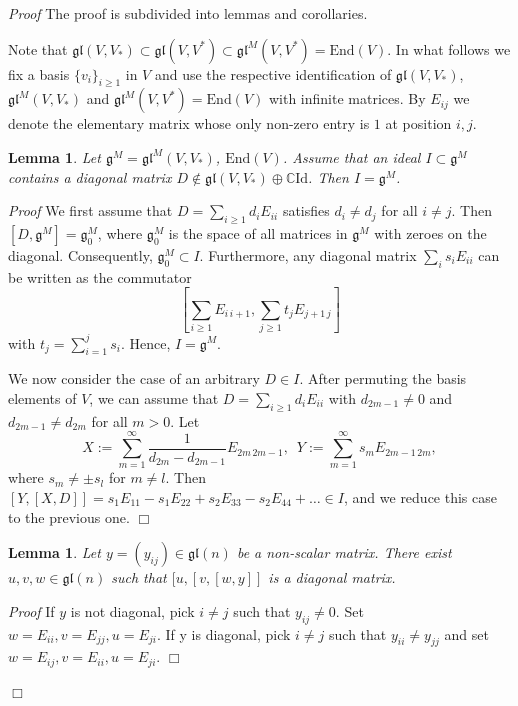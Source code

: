 \documentclass[10pt]{amsart}
\newcounter{theorem}
\newtheorem{lemma}[theo]{Lemma}
\renewenvironment{proof}{ \emph{Proof}}{$\Box$}
\newcommand {\CC} {\mathbb {C}}
\newcommand{\id}{\mathrm{Id}}
\renewcommand{\gg}{\mathfrak{g}}
\newcommand{\gl}{\mathfrak{gl}}
\newcommand{\End}{\mathrm{End}}
\begin{document}
\begin{proof} The proof is subdivided into lemmas and corollaries. 

Note that $\gl(V,V_*)\subset\gl(V,V^*)\subset \gl^M(V,V^*)=\End(V)$.
In what follows we fix a basis $\{v_i\}_{i\geq 1}$ in $V$ and use the respective identification of $\gl(V,V_*)$, $\gl^M(V,V_*)$ and  
$\gl^M(V,V^*)=\End(V)$
with infinite matrices.
By $E_{ij}$ we denote the elementary matrix whose only non-zero entry is $1$ at position $i,j$.

\begin{lemma}\label{lem_diag} Let $\gg^M =\gl^M(V,V_*)$,  $\End(V)$. Assume that an ideal $I \subset \gg^M$ contains a diagonal matrix $D \notin \gl(V,V_*) \oplus \CC \id$. Then $I = \gg^M$.
\end{lemma}

\begin{proof}
We first assume that $D=\sum_{i\geq 1} d_i E_{ii}$ satisfies $d_i \neq d_j$ for all $i \neq j$.
Then $[D,\gg^M] = \gg^M_0$, where $\gg^M_0$ is the space of all matrices in $\gg^M$ with zeroes on the diagonal. Consequently, $\gg^M_0 \subset I$. 
Furthermore, any diagonal matrix $\sum_{i} s_i E_{ii}$ can be written as the commutator
\begin{equation}
 \left[\sum_{i \geq 1} E_{i\,i+1}, \sum_{j \geq1} t_j E_{j+1\,j}\right] \nonumber
\end{equation}
with $t_j = \sum_{i=1}^{j} s_i$.
Hence, $I=\gg^M$.

We now consider the case of an arbitrary $D \in I$. After permuting the basis elements of $V$, we can assume that 
$D = \sum_{i\geq 1} d_i E_{ii}$ with $d_{2m-1} \neq 0$ and  $d_{2m-1} \neq d_{2m}$ for all $m > 0$. Let 
\begin{equation}\label{eq:lem_diag}
 X := \sum_{m=1}^{\infty} \frac{1}{d_{2m}-d_{2m-1}}E_{2m\,2m-1}, \,\,\, Y:=\sum_{m=1}^{\infty} s_m E_{2m-1\,2m}, \nonumber
\end{equation}
where $s_m\neq \pm s_l$ for $m \neq l$. Then $[Y,[X,D]]=s_1E_{11} - s_1E_{22} + s_2E_{33} -s_2E_{44} +\dots \in I$, and we reduce this case to the previous one.
\end{proof}

\begin{lemma}\label{lem_diag2} 
Let $y = (y_{ij})\in \gl(n)$ be a non-scalar matrix. There exist $u,v,w \in \gl(n)$ such that $[u,[v,[w,y]]$ is a diagonal matrix.
\end{lemma}
\begin{proof}
 If $y$ is not diagonal, pick $i \neq j$ such that $y_{ij} \neq 0$. Set $w=E_{ii}, v=E_{jj}, u=E_{ji}$. If y is diagonal, pick $i \neq j$ such that $y_{ii} \neq y_{jj}$ and set $w=E_{ij}, v=E_{ii}, u=E_{ji}$.
\end{proof}


\end{proof}
\end{document}
